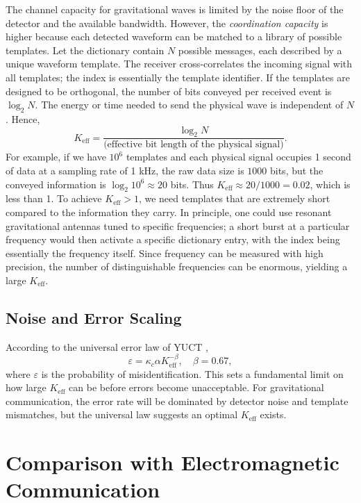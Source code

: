 \documentclass[12pt,a4paper]{article}
\newcommand{\Keff}{K_{\mathrm{eff}}}
\newcommand{\kappac}{\kappa_c}
\newcommand{\eps}{\varepsilon}
\begin{document}
	The channel capacity for gravitational waves is limited by the noise floor of the detector and the available bandwidth. However, the \emph{coordination capacity} is higher because each detected waveform can be matched to a library of possible templates. Let the dictionary contain \(N\) possible messages, each described by a unique waveform template. The receiver cross‑correlates the incoming signal with all templates; the index is essentially the template identifier. If the templates are designed to be orthogonal, the number of bits conveyed per received event is \(\log_2 N\). The energy or time needed to send the physical wave is independent of \(N\). Hence,
	\begin{equation}
		\Keff = \frac{\log_2 N}{\text{(effective bit length of the physical signal)}}.
	\end{equation}
	For example, if we have \(10^6\) templates and each physical signal occupies 1 second of data at a sampling rate of 1 kHz, the raw data size is \(1000\) bits, but the conveyed information is \(\log_2 10^6 \approx 20\) bits. Thus \(\Keff \approx 20/1000 = 0.02\), which is less than 1. To achieve \(\Keff > 1\), we need templates that are extremely short compared to the information they carry. In principle, one could use resonant gravitational antennas tuned to specific frequencies; a short burst at a particular frequency would then activate a specific dictionary entry, with the index being essentially the frequency itself. Since frequency can be measured with high precision, the number of distinguishable frequencies can be enormous, yielding a large \(\Keff\).
	
	\subsection{Noise and Error Scaling}
	
	According to the universal error law of YUCT \cite{AppendixL},
	\begin{equation}
		\eps = \kappac \alpha \Keff^{-\beta}, \quad \beta = 0.67,
		\label{eq:universal-scaling}   %
	\end{equation}
	where \(\eps\) is the probability of misidentification. This sets a fundamental limit on how large \(\Keff\) can be before errors become unacceptable. For gravitational communication, the error rate will be dominated by detector noise and template mismatches, but the universal law suggests an optimal \(\Keff\) exists.
	
	\section{Comparison with Electromagnetic Communication}
	\label{sec:comparison}
	
\end{document}
